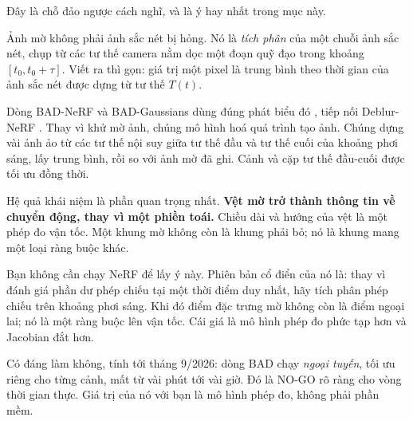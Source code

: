 \documentclass[../../deep_learning.tex]{subfiles}
\begin{document}
Đây là chỗ đảo ngược cách nghĩ, và là ý hay nhất trong mục này.

Ảnh mờ không phải ảnh sắc nét bị hỏng. Nó là \emph{tích phân} của một chuỗi ảnh sắc nét, chụp từ các tư thế camera nằm dọc một đoạn quỹ đạo trong khoảng \([t_0, t_0+\tau]\). Viết ra thì gọn: giá trị một pixel là trung bình theo thời gian của ảnh sắc nét được dựng từ tư thế \(T(t)\).

Dòng BAD-NeRF và BAD-Gaussians dùng đúng phát biểu đó \cite{wang2023badnerf,zhao2024badgaussians}, tiếp nối Deblur-NeRF \cite{ma2022deblurnerf}. Thay vì khử mờ ảnh, chúng mô hình hoá quá trình tạo ảnh. Chúng dựng vài ảnh ảo từ các tư thế nội suy giữa tư thế đầu và tư thế cuối của khoảng phơi sáng, lấy trung bình, rồi so với ảnh mờ đã ghi. Cảnh và cặp tư thế đầu-cuối được tối ưu đồng thời.

Hệ quả khái niệm là phần quan trọng nhất. \textbf{Vệt mờ trở thành thông tin về chuyển động, thay vì một phiền toái.} Chiều dài và hướng của vệt là một phép đo vận tốc. Một khung mờ không còn là khung phải bỏ; nó là khung mang một loại ràng buộc khác.

Bạn không cần chạy NeRF để lấy ý này. Phiên bản cổ điển của nó là: thay vì đánh giá phần dư phép chiếu tại một thời điểm duy nhất, hãy tích phân phép chiếu trên khoảng phơi sáng. Khi đó điểm đặc trưng mờ không còn là điểm ngoại lai; nó là một ràng buộc lên vận tốc. Cái giá là mô hình phép đo phức tạp hơn và Jacobian đắt hơn.

Có đáng làm không, tính tới tháng 9/2026: dòng BAD chạy \emph{ngoại tuyến}, tối ưu riêng cho từng cảnh, mất từ vài phút tới vài giờ. Đó là NO-GO rõ ràng cho vòng thời gian thực. Giá trị của nó với bạn là mô hình phép đo, không phải phần mềm.
\end{document}
